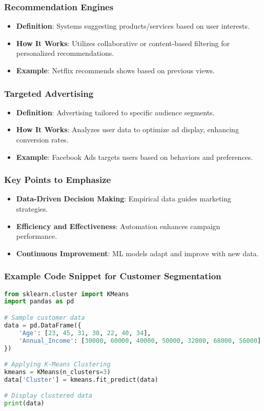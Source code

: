 \documentclass[aspectratio=169]{beamer}
\begin{document}
\begin{frame}
    \frametitle{Recommendation Engines}
    \begin{itemize}
        \item \textbf{Definition}: Systems suggesting products/services based on user interests.
        \item \textbf{How It Works}: Utilizes collaborative or content-based filtering for personalized recommendations.
        \item \textbf{Example}: Netflix recommends shows based on previous views.
    \end{itemize}
\end{frame}

\begin{frame}
    \frametitle{Targeted Advertising}
    \begin{itemize}
        \item \textbf{Definition}: Advertising tailored to specific audience segments.
        \item \textbf{How It Works}: Analyzes user data to optimize ad display, enhancing conversion rates.
        \item \textbf{Example}: Facebook Ads targets users based on behaviors and preferences.
    \end{itemize}
\end{frame}

\begin{frame}
    \frametitle{Key Points to Emphasize}
    \begin{itemize}
        \item \textbf{Data-Driven Decision Making}: Empirical data guides marketing strategies.
        \item \textbf{Efficiency and Effectiveness}: Automation enhances campaign performance.
        \item \textbf{Continuous Improvement}: ML models adapt and improve with new data.
    \end{itemize}
\end{frame}

\begin{frame}[fragile]
    \frametitle{Example Code Snippet for Customer Segmentation}
    \begin{lstlisting}[language=Python]
from sklearn.cluster import KMeans
import pandas as pd

# Sample customer data
data = pd.DataFrame({
    'Age': [23, 45, 31, 38, 22, 40, 34],
    'Annual_Income': [30000, 60000, 40000, 50000, 32000, 68000, 56000]
})

# Applying K-Means Clustering
kmeans = KMeans(n_clusters=3)
data['Cluster'] = kmeans.fit_predict(data)

# Display clustered data
print(data)
    \end{lstlisting}
\end{frame}
\end{document}
